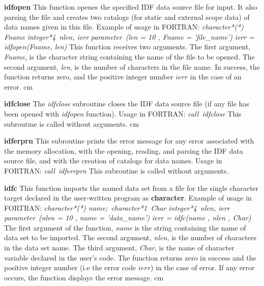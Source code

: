 {
{\bf idfopen}\hfil\break
This function openes the specified IDF data source file for input.
It also parsing the file and creates two catalogs (for static
and external scope data) of data names given in this file.
Example of usage in FORTRAN:\hfil\break
{\it character*(*) Fname}\hfil\break
{\it integer*4\ nlen, ierr}\hfil\break
{\it parameter\ (len = 10 , Fname = 'file\_name')}\hfil\break
{\it ierr = idfopen(Fname, len)}\hfil\break
This function receives two arguments. 
The first argument, {\it Fname}, is the character string
containing the name of the file to be opened.
The second argument, {\it len}, is the number of characters in the file name. 
In success, the function returns zero, and
the positive integer number $ierr$ in the case of an error.
}
 cm

{
{\bf idfclose}\hfil\break
The {\it idfclose} subroutine closes the IDF data source file 
(if any file has been opened with {\it idfopen} function).
Usage in FORTRAN:\hfil\break
{\it call\ idfclose}\hfil\break 
This subroutine is called without arguments. 
}
 cm

{
{\bf idferprn}\hfil\break
This subroutine prints the error message for any error
associated with the memory allocation,
with the opening, reading, and parsing the IDF data source file,
and with the creation of catalogs for data names.\hfil\break
Usage in FORTRAN:\hfil\break
{\it call\ idferrprn}\hfil\break 
This subroutine is called without arguments. 
}
\newpage

{
{\bf idfc}\hfil\break
This function imports the named data set from a file 
for the single character target declared in the user-written program
as {\bf character}.
Example of usage in FORTRAN:\hfil\break
{\it character*(*) name;\ character*1\ Char}\hfil\break
{\it integer*4\ nlen, ierr}\hfil\break
{\it parameter\ (nlen = 10 , name = 'data\_name')}\hfil\break
{\it ierr = idfc(name , nlen , Char)}\hfil\break
The first argument of the function, {\it name} is the string containing 
the name of data set to be imported. 
The second argument, {\it nlen}, is the number of characters 
in the data set name. 
The third argument, {\it Char},
is the name of character variable declared in the user's code. 
The function returns zero in success
and the positive integer number (i.e the error code $ierr$) 
in the case of error.
If any error occurs, the function displays the error message. 
}
 cm

